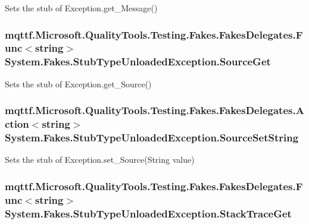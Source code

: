 Sets the stub of Exception.\-get\-\_\-\-Message()

\hypertarget{class_system_1_1_fakes_1_1_stub_type_unloaded_exception_ad1267b29d88ca59ea335d4e84f581501}{
\subsubsection[{Source\-Get}]{\setlength{\rightskip}{0pt plus 5cm}mqttf.\-Microsoft.\-Quality\-Tools.\-Testing.\-Fakes.\-Fakes\-Delegates.\-Func$<$string$>$ System.\-Fakes.\-Stub\-Type\-Unloaded\-Exception.\-Source\-Get}}\label{class_system_1_1_fakes_1_1_stub_type_unloaded_exception_ad1267b29d88ca59ea335d4e84f581501}


Sets the stub of Exception.\-get\-\_\-\-Source()

\hypertarget{class_system_1_1_fakes_1_1_stub_type_unloaded_exception_acca015b4a514f7e09096590e9eef0f46}{
\subsubsection[{Source\-Set\-String}]{\setlength{\rightskip}{0pt plus 5cm}mqttf.\-Microsoft.\-Quality\-Tools.\-Testing.\-Fakes.\-Fakes\-Delegates.\-Action$<$string$>$ System.\-Fakes.\-Stub\-Type\-Unloaded\-Exception.\-Source\-Set\-String}}\label{class_system_1_1_fakes_1_1_stub_type_unloaded_exception_acca015b4a514f7e09096590e9eef0f46}


Sets the stub of Exception.\-set\-\_\-\-Source(\-String value)

\hypertarget{class_system_1_1_fakes_1_1_stub_type_unloaded_exception_a25ffa3d56bf274d58affb8d925abe5d1}{
\subsubsection[{Stack\-Trace\-Get}]{\setlength{\rightskip}{0pt plus 5cm}mqttf.\-Microsoft.\-Quality\-Tools.\-Testing.\-Fakes.\-Fakes\-Delegates.\-Func$<$string$>$ System.\-Fakes.\-Stub\-Type\-Unloaded\-Exception.\-Stack\-Trace\-Get}}\label{class_system_1_1_fakes_1_1_stub_type_unloaded_exception_a25ffa3d56bf274d58affb8d925abe5d1}



